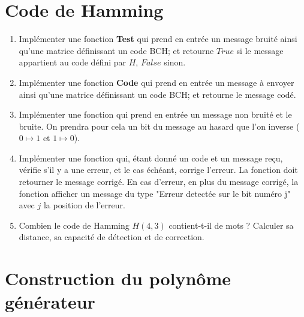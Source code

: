 \section{Code de Hamming}

\begin{enumerate}
\item Implémenter une fonction \textbf{Test} qui prend en entrée un message bruité ainsi qu'une matrice définissant un code BCH; et retourne $True$ si le message appartient au code défini par $H$, $False$ sinon.
\item Implémenter une fonction \textbf{Code} qui prend en entrée un message à envoyer ainsi qu'une matrice définissant un code BCH; et retourne le message codé.
\item Implémenter une fonction qui prend en entrée un message non bruité et le bruite. On prendra pour cela un bit du message au hasard que l'on inverse ($0\mapsto 1$ et $1\mapsto 0$).
\item Implémenter une fonction qui, étant donné un code et un message reçu, vérifie s'il y a une erreur, et le cas échéant, corrige l'erreur. La fonction doit retourner le message corrigé. En cas d'erreur, en plus du message corrigé, la fonction afficher un message du type "Erreur detectée sur le bit numéro j" avec $j$ la position de l'erreur.
\item Combien le code de Hamming $H(4,3)$ contient-t-il de mots ? Calculer sa distance, sa capacité de détection et de correction.
\end{enumerate}

\section{Construction du polynôme générateur}

\\
\\

